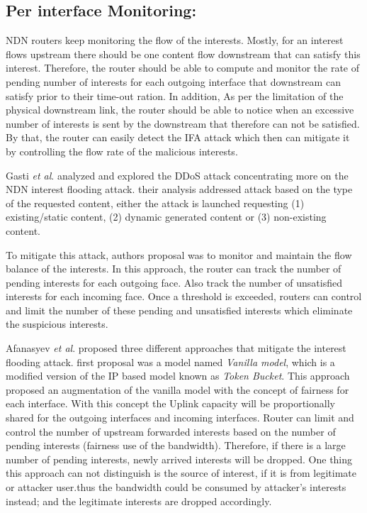 \documentclass[conference]{IEEEtran}
\begin{document}
\subsection{Per interface Monitoring: }
NDN routers keep monitoring the flow of the interests. Mostly, for an interest flows upstream there should be one content flow downstream that can satisfy this interest. Therefore, the router should be able to compute and monitor the rate of pending number of interests for each outgoing interface that downstream can satisfy prior to their time-out ration. In addition, As per the limitation of the physical downstream link, the router should be able to notice when an excessive number of interests is sent by the downstream that therefore can not be satisfied. By that, the router can easily detect the IFA attack which then can mitigate it by controlling the flow rate of the malicious interests. 

Gasti \textit{et al}. \cite{Gasti2013} analyzed and explored the DDoS attack concentrating more on the NDN interest flooding attack. their analysis addressed attack based on the type of the requested content, either the attack is launched requesting (1) existing/static content, (2) dynamic generated content or (3) non-existing content. 

To mitigate this attack, authors proposal was to monitor and maintain the flow balance of the interests. In this approach, the router can track the number of pending interests for each outgoing face. Also track the number of unsatisfied interests for each incoming face. Once a threshold is exceeded, routers can control and limit the number of these pending and unsatisfied interests which eliminate the suspicious interests.  

Afanasyev \textit{et al}. \cite{6663516} proposed three different approaches that mitigate the interest flooding attack. first proposal was a model named \textit{Vanilla model}, which is a modified version of the IP based model known as \textit{Token Bucket}. This approach proposed an augmentation of the vanilla model with the concept of fairness for each interface. With this concept the Uplink capacity will be proportionally shared for the outgoing interfaces and incoming interfaces. Router can limit and control the number of upstream forwarded interests based on the number of pending interests (fairness use of the bandwidth). Therefore, if there is a large number of pending interests, newly arrived interests will be dropped. One thing this approach can not distinguish is the source of interest, if it is from  legitimate or attacker user.thus the bandwidth could be consumed by attacker's interests instead; and the legitimate interests are dropped accordingly.
\end{document}
